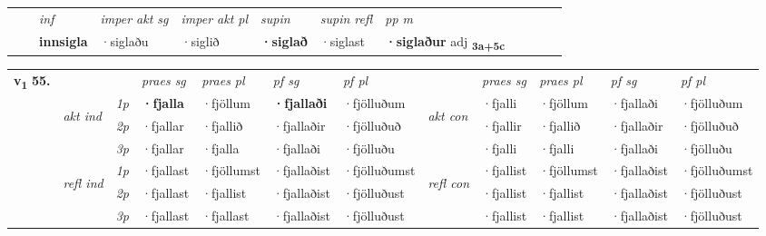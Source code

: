 \begin{tabular}{llllllllllll}
 & & \textit{inf} & \textit{imper akt sg} & \textit{imper akt pl}    & \textit{supin} & \textit{supin refl} & \textit{pp m}     \\*
  & & \textbf{innsigla} & ·siglaðu  & ·siglið    &  \textbf{·siglað} & ·siglast & \textbf{·siglaður} adj \textbf{\textsubscript{3a+5c}} \\*
\cmidrule{1-12}
\end{tabular}



\begin{tabular}{llllllllllll} \toprule
\multirow{4}{*}{{{\textbf{v{\textsubscript{1}}} \Large{\textbf{55.}}}}}  & &   &  \textit{praes sg}  & \textit{praes pl}  &\textit{ pf sg} & \textit{pf pl} &  &  \textit{praes sg}  & \textit{praes pl}  & \textit{pf sg} & \textit{pf pl } \\*
	\cmidrule{4-7} \cmidrule{9-12}
 & \multirow{3}{*}{\begin{turn}{90}\textit{akt ind}\end{turn}} & {\textit{1p}} & \textbf{·fjalla} & ·fjöllum    & \textbf{·fjallaði} & ·fjölluðum & \multirow{3}{*}{\begin{turn}{90}\textit{akt con}\end{turn}} &·fjalli & ·fjöllum & ·fjallaði & ·fjölluðum\\*
& &  {\textit{2p}} &  ·fjallar  & ·fjallið   & ·fjallaðir & ·fjölluðuð & & ·fjallir & ·fjallið & ·fjallaðir & ·fjölluðuð \\*
& &  {\textit{3p}} & ·fjallar & ·fjalla   & ·fjallaði & ·fjölluðu & & ·fjalli & ·fjalli& ·fjallaði & ·fjölluðu  \\*
\cmidrule{4-7} \cmidrule{9-12}
 &\multirow{3}{*}{\begin{turn}{90}\textit{refl ind}\end{turn}} & {\textit{1p}} & ·fjallast & ·fjöllumst    & ·fjallaðist & ·fjölluðumst & \multirow{3}{*}{\begin{turn}{90}\textit{refl con}\end{turn}}  &·fjallist & ·fjöllumst & ·fjallaðist & ·fjölluðumst\\*
 &&  {\textit{2p}} &  ·fjallast  & ·fjallist   & ·fjallaðist & ·fjölluðust & &·fjallist & ·fjallist & ·fjallaðist & ·fjölluðust \\*
& &  {\textit{3p}} & ·fjallast & ·fjallast   & ·fjallaðist & ·fjölluðust & & ·fjallist & ·fjallist& ·fjallaðist & ·fjölluðust  \\*
\cmidrule{4-7} \cmidrule{9-12}
\end{tabular}


